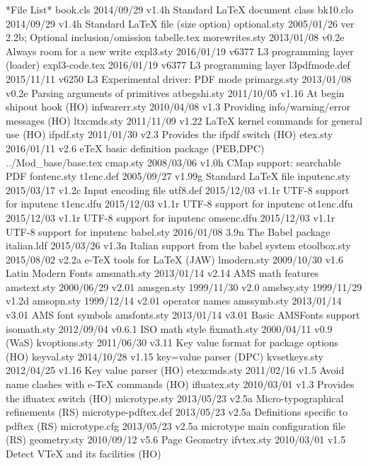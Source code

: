  *File List*
    book.cls    2014/09/29 v1.4h Standard LaTeX document class
    bk10.clo    2014/09/29 v1.4h Standard LaTeX file (size option)
optional.sty    2005/01/26 ver 2.2b;  Optional inclusion/omission
 tabelle.tex
morewrites.sty    2013/01/08 v0.2e Always room for a new write
   expl3.sty    2016/01/19 v6377 L3 programming layer (loader) 
expl3-code.tex    2016/01/19 v6377 L3 programming layer 
l3pdfmode.def    2015/11/11 v6250 L3 Experimental driver: PDF mode
primargs.sty    2013/01/08 v0.2e Parsing arguments of primitives
atbegshi.sty    2011/10/05 v1.16 At begin shipout hook (HO)
infwarerr.sty    2010/04/08 v1.3 Providing info/warning/error messages (HO)
 ltxcmds.sty    2011/11/09 v1.22 LaTeX kernel commands for general use (HO)
   ifpdf.sty    2011/01/30 v2.3 Provides the ifpdf switch (HO)
    etex.sty    2016/01/11 v2.6 eTeX basic definition package (PEB,DPC)
../Mod_base/base.tex
    cmap.sty    2008/03/06 v1.0h CMap support: searchable PDF
 fontenc.sty
   t1enc.def    2005/09/27 v1.99g Standard LaTeX file
inputenc.sty    2015/03/17 v1.2c Input encoding file
    utf8.def    2015/12/03 v1.1r UTF-8 support for inputenc
   t1enc.dfu    2015/12/03 v1.1r UTF-8 support for inputenc
  ot1enc.dfu    2015/12/03 v1.1r UTF-8 support for inputenc
  omsenc.dfu    2015/12/03 v1.1r UTF-8 support for inputenc
   babel.sty    2016/01/08 3.9n The Babel package
 italian.ldf    2015/03/26 v1.3n Italian support from the babel system
etoolbox.sty    2015/08/02 v2.2a e-TeX tools for LaTeX (JAW)
 lmodern.sty    2009/10/30 v1.6 Latin Modern Fonts
 amsmath.sty    2013/01/14 v2.14 AMS math features
 amstext.sty    2000/06/29 v2.01
  amsgen.sty    1999/11/30 v2.0
  amsbsy.sty    1999/11/29 v1.2d
  amsopn.sty    1999/12/14 v2.01 operator names
 amssymb.sty    2013/01/14 v3.01 AMS font symbols
amsfonts.sty    2013/01/14 v3.01 Basic AMSFonts support
 isomath.sty    2012/09/04 v0.6.1 ISO math style
 fixmath.sty    2000/04/11 v0.9 (WaS)
kvoptions.sty    2011/06/30 v3.11 Key value format for package options (HO)
  keyval.sty    2014/10/28 v1.15 key=value parser (DPC)
kvsetkeys.sty    2012/04/25 v1.16 Key value parser (HO)
etexcmds.sty    2011/02/16 v1.5 Avoid name clashes with e-TeX commands (HO)
ifluatex.sty    2010/03/01 v1.3 Provides the ifluatex switch (HO)
microtype.sty    2013/05/23 v2.5a Micro-typographical refinements (RS)
microtype-pdftex.def    2013/05/23 v2.5a Definitions specific to pdftex (RS)
microtype.cfg    2013/05/23 v2.5a microtype main configuration file (RS)
geometry.sty    2010/09/12 v5.6 Page Geometry
  ifvtex.sty    2010/03/01 v1.5 Detect VTeX and its facilities (HO)
